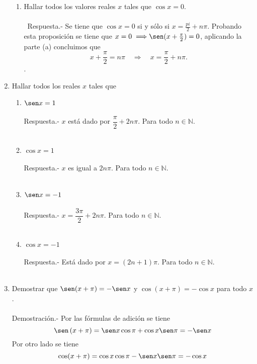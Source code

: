 \begin{enumerate}
\begin{enumerate}{\bfseries (a)}
    \item Hallar todos los valores reales $x$ tales que $\cos x =0$.\\\\\
	Respuesta.-\; Se tiene que  $\cos x=0$ si y sólo si $x=\frac{pi}{2}+n\pi$. Probando esta proposición se tiene que $x=0\;\Longrightarrow \sen(x+\frac{\pi}{2})=0$, aplicando la parte (a) concluimos que $$x+\dfrac{\pi}{2}=n\pi \quad \Longrightarrow \quad x=\dfrac{\pi}{2}+n\pi.$$.\\

\end{enumerate}

\item Hallar todos los reales $x$ tales que 
\begin{enumerate}[\bfseries a)]
    
    \item $\sen x = 1$\\\\
	Respuesta.-\; $x$ está dado por $\dfrac{\pi}{2}+2n\pi$. Para todo $n \in \mathbb{N}$.\\\\

    \item $\cos x = 1$\\\\
	Respuesta.-\; $x$ es igual a $2n\pi.$ Para todo $n \in \mathbb{N}$.\\\\

    \item $\sen x = -1$\\\\
	Respuesta.-\; $x=\dfrac{3\pi}{2}+2n\pi$. Para todo $n \in \mathbb{N}$.\\\\

    \item $\cos x = -1$\\\\
	Respuesta.-\; Está dado por $x=(2n+1)\pi$. Para todo $n \in \mathbb{N}$.\\\\

\end{enumerate}

\item Demostrar que $\sen(x+\pi) = -\sen x$ y $\cos(x+\pi) = -\cos x$ para todo $x$.\\\\
    Demostración.-\; Por las fórmulas de adición se tiene $$\sen\left(x+\pi\right) = \sen x \cos \pi +\cos x \sen \pi = -\sen x$$ 
	Por otro lado se tiene $$\cos (x+\pi) = \cos x \cos \pi - \sen x \sen \pi = -\cos x$$\\


\end{enumerate}
